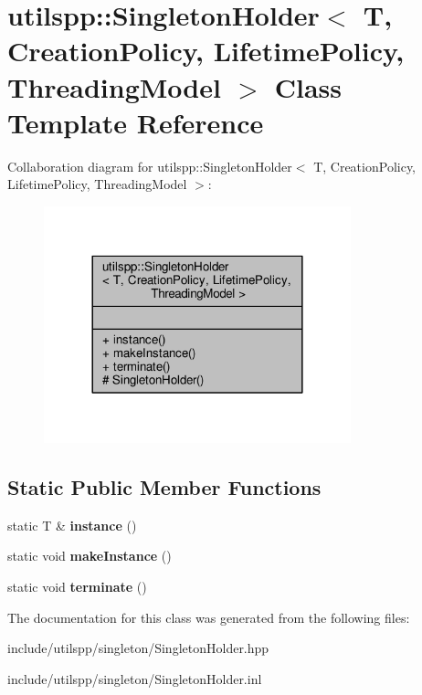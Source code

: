 \hypertarget{classutilspp_1_1SingletonHolder}{\section{utilspp\-:\-:Singleton\-Holder$<$ T, Creation\-Policy, Lifetime\-Policy, Threading\-Model $>$ Class Template Reference}
\label{classutilspp_1_1SingletonHolder}
}


Collaboration diagram for utilspp\-:\-:Singleton\-Holder$<$ T, Creation\-Policy, Lifetime\-Policy, Threading\-Model $>$\-:\nopagebreak
\begin{figure}[H]
\begin{center}
\leavevmode
\includegraphics[width=252pt]{classutilspp_1_1SingletonHolder__coll__graph}
\end{center}
\end{figure}
\subsection*{Static Public Member Functions}
\begin{DoxyCompactItemize}
\item 
\hypertarget{classutilspp_1_1SingletonHolder_ac47481d775e3aa69b5bdba9a159f2322}{static T \& {\bfseries instance} ()}\label{classutilspp_1_1SingletonHolder_ac47481d775e3aa69b5bdba9a159f2322}

\item 
\hypertarget{classutilspp_1_1SingletonHolder_ad3d625b25955487f61a652a2c5944787}{static void {\bfseries make\-Instance} ()}\label{classutilspp_1_1SingletonHolder_ad3d625b25955487f61a652a2c5944787}

\item 
\hypertarget{classutilspp_1_1SingletonHolder_a67c0f4b310db8f3d069f7695841b53c6}{static void {\bfseries terminate} ()}\label{classutilspp_1_1SingletonHolder_a67c0f4b310db8f3d069f7695841b53c6}

\end{DoxyCompactItemize}


The documentation for this class was generated from the following files\-:\begin{DoxyCompactItemize}
\item 
include/utilspp/singleton/Singleton\-Holder.\-hpp\item 
include/utilspp/singleton/Singleton\-Holder.\-inl\end{DoxyCompactItemize}
